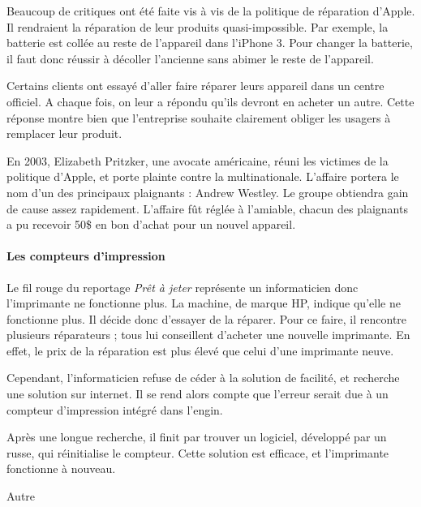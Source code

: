 \smallskip
Beaucoup de critiques ont été faite vis à vis de la politique de réparation d'Apple. Il rendraient la réparation de leur produits quasi-impossible. Par exemple, la batterie est collée au reste de l'appareil dans l'iPhone 3. Pour changer la batterie, il faut donc réussir à décoller l'ancienne sans abimer le reste de l'appareil.  

Certains clients ont essayé d'aller faire réparer leurs appareil dans un centre officiel. A chaque fois, on leur a répondu qu'ils devront en acheter un autre. Cette réponse montre bien que l'entreprise souhaite clairement obliger les usagers à remplacer leur produit. 
\smallskip


En 2003, Elizabeth Pritzker, une avocate américaine, réuni les victimes de la politique d'Apple, et porte plainte contre la multinationale. L'affaire portera le nom d'un des principaux plaignants : Andrew Westley. Le groupe obtiendra gain de cause assez rapidement. L'affaire fût réglée à l'amiable, chacun des plaignants a pu recevoir 50\$ en bon d'achat pour un nouvel appareil. 

\paragraph*{Les compteurs d'impression}

Le fil rouge du reportage \textit{Prêt à jeter} représente un informaticien donc l'imprimante ne fonctionne plus. La machine, de marque HP, indique qu'elle ne fonctionne plus. Il décide donc d'essayer de la réparer. Pour ce faire, il rencontre plusieurs réparateurs ; tous lui conseillent d'acheter une nouvelle imprimante. En effet, le prix de la réparation est plus élevé que celui d'une imprimante neuve. 

Cependant, l'informaticien refuse de céder à la solution de facilité, et recherche une solution sur internet. Il se rend alors compte que l'erreur serait due à un compteur d'impression intégré dans l'engin. 

Après une longue recherche, il finit par trouver un logiciel, développé par un russe, qui réinitialise le compteur. Cette solution est efficace, et l'imprimante fonctionne à nouveau.

\medbreak

Autre